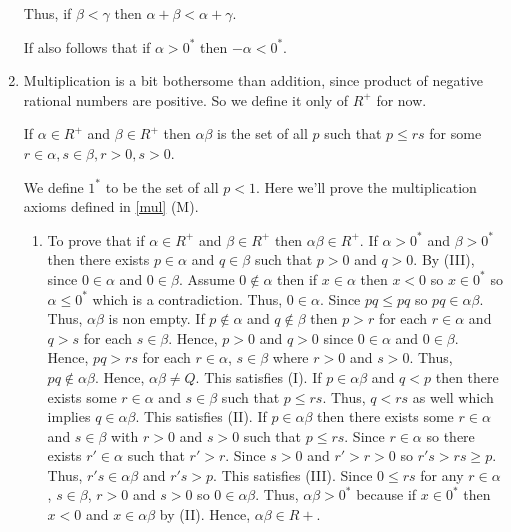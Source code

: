 \begin{enumerate}[{\bf Step 1.}]
Thus, if $\beta < \gamma$ then $\alpha + \beta < \alpha + \gamma$.

If also follows that if $\alpha > 0^*$ then $-\alpha < 0^*$.

\item Multiplication is a bit bothersome than addition, since product of negative rational numbers are positive.
So we define it only of $R^+$ for now.

If $\alpha \in R^+$ and $\beta \in R^+$ then $\alpha \beta$ is the set of all $p$ such that $p \leq rs$
for some $r \in \alpha, s \in \beta, r > 0, s > 0$.

We define $1^*$ to be the set of all $p < 1$.
Here we'll prove the multiplication axioms defined in \ref{mul} (M).

\begin{enumerate}[(M1)]
	\item To prove that if $\alpha \in R^+$ and $\beta \in R^+$ then $\alpha \beta \in R^+$.
	\bigbreak \quad
	If $\alpha > 0^*$ and $\beta > 0^*$ then there exists $p \in \alpha$ and $q \in \beta$ such that $p > 0$ and $q > 0$.
	By (III), since $0 \in \alpha$ and $0 \in \beta$.
	\bigbreak \quad
	Assume $0 \notin \alpha$ then if $x \in \alpha$ then $x < 0$ so $x \in 0^*$ so $\alpha \leq 0^*$ which is a contradiction.
	Thus, $0 \in \alpha$.
	\bigbreak \quad
	Since $pq \leq pq$ so $pq \in \alpha \beta$. Thus, $\alpha \beta$ is non empty.
	\bigbreak \quad
	If $p \notin \alpha$ and $q \notin \beta$ then $p > r$ for each $r \in \alpha$ and $q > s$ for each $s \in \beta$.
	Hence, $p > 0$ and $q > 0$ since $0 \in \alpha$ and $0 \in \beta$.
	Hence, $pq > rs$ for each $r \in \alpha$, $s \in \beta$ where $r > 0$ and $s > 0$. Thus, $pq \notin \alpha \beta$.
	Hence, $\alpha \beta \neq Q$.
	This satisfies (I).
	\bigbreak \quad
	If $p \in \alpha \beta$ and $q < p$ then there exists some $r \in \alpha$ and $s \in \beta$
	such that $p \leq rs$. Thus, $q < rs$ as well which implies $q \in \alpha \beta$. This satisfies (II).
	\bigbreak \quad
	If $p \in \alpha \beta$ then there exists some $r \in \alpha$ and $s \in \beta$ with $r > 0$ and $s > 0$
	such that $p \leq rs$. Since $r \in \alpha$ so there exists $r' \in \alpha$ such that $r' > r$.
	Since $s > 0$ and $r' > r > 0$ so $r's > rs \geq p$. Thus, $r's \in \alpha \beta$ and $r's > p$.
	This satisfies (III).
	\bigbreak \quad
	Since $0 \leq rs$ for any $r \in \alpha$, $s \in \beta$, $r > 0$ and $s > 0$ so $0 \in \alpha \beta$.
	Thus, $\alpha \beta > 0^*$ because if $x \in 0^*$ then $x < 0$ and $x \in \alpha \beta$ by (II).
	\bigbreak \quad
	Hence, $\alpha \beta \in R+$.


\end{enumerate}
\end{enumerate}
